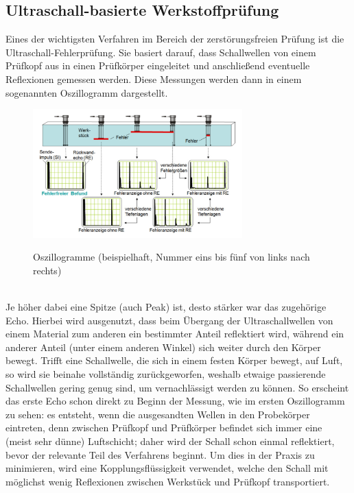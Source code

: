 \documentclass[reducespace,stylepage,semiarbeit]{spezidoc}
\begin{document}
\subsection{Ultraschall-basierte Werkstoffprüfung}
Eines der wichtigsten Verfahren im Bereich der zerstörungsfreien Prüfung ist die Ultraschall-Fehlerprüfung. 
Sie basiert darauf, dass Schallwellen von einem Prüfkopf aus in einen Prüfkörper eingeleitet und anschließend eventuelle Reflexionen gemessen werden. 
Diese Messungen werden dann in einem sogenannten Oszillogramm dargestellt.
\begin{figure}[h]\begin{center}
\label{oszillogramme}
\includegraphics[width=0.72\textwidth]{pictures/Oszillogramme.jpg}
\caption{Oszillogramme (beispielhaft, Nummer eins bis fünf von links nach rechts)}
\end{center}\end{figure} \\
Je höher dabei eine Spitze (auch Peak) ist, desto stärker war das zugehörige Echo. 
Hierbei wird ausgenutzt, dass beim Übergang der Ultraschallwellen von einem Material zum anderen ein bestimmter Anteil reflektiert wird, während ein anderer Anteil (unter einem anderen Winkel) sich weiter durch den Körper bewegt. 
Trifft eine Schallwelle, die sich in einem festen Körper bewegt, auf Luft, so wird sie beinahe vollständig zurückgeworfen, weshalb etwaige passierende Schallwellen gering genug sind, um vernachlässigt werden zu können. 
So erscheint das erste Echo schon direkt zu Beginn der Messung, wie im ersten Oszillogramm zu sehen: es entsteht, wenn die ausgesandten Wellen in den Probekörper eintreten, denn zwischen Prüfkopf und Prüfkörper befindet sich immer eine (meist sehr dünne) Luftschicht; daher wird der Schall schon einmal reflektiert, bevor der relevante Teil des Verfahrens beginnt. 
Um dies in der Praxis zu minimieren, wird eine Kopplungsflüssigkeit verwendet, welche den Schall mit möglichst wenig Reflexionen zwischen Werkstück und Prüfkopf transportiert. 
\end{document}
